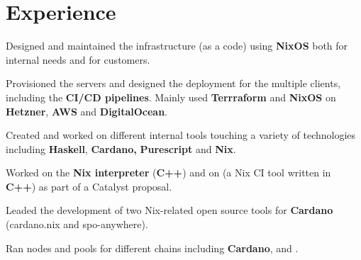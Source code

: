 \documentclass[]{cv}
\begin{document}
%
%

%
%

%
%

\begin{minipage}[t]{0.75\textwidth}


  \section{Experience}
  \vspace{\topsep} %
  \begin{tightemize}
  \item Designed and maintained the infrastructure (as a code) using
    \textbf{NixOS} both for internal needs and for customers.
  \item Provisioned the servers and designed the deployment for the
    multiple clients, including the \textbf{CI/CD pipelines}. Mainly
    used \textbf{Terrraform} and \textbf{NixOS} on \textbf{Hetzner},
    \textbf{AWS} and \textbf{DigitalOcean}.
  \item Created and worked on different internal tools touching a
    variety of technologies including \textbf{Haskell},
    \textbf{Cardano,} \textbf{Purescript} and \textbf{Nix}.
  \item Worked on the \textbf{Nix interpreter} (\textbf{C++}) and on
     (a Nix CI
    tool written in \textbf{C++}) as part of a Catalyst proposal.
  \item Leaded the development of two Nix-related open source tools
    for \textbf{Cardano} (cardano.nix and spo-anywhere).
  \item Ran nodes and pools for different chains including
    \textbf{Cardano},  and .
  \end{tightemize}
  \sectionsep


\end{minipage}
\end{document}
